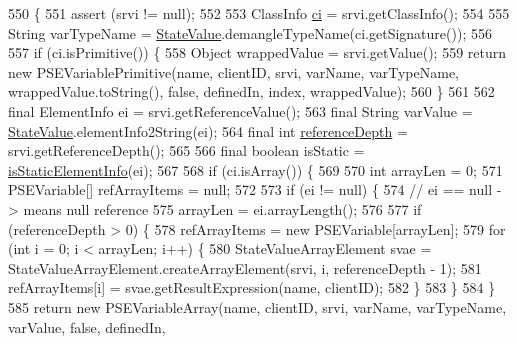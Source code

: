 \begin{DoxyCode}
550                                    \{
551     assert (srvi != null);
552 
553     ClassInfo \hyperlink{classgov_1_1nasa_1_1jpf_1_1inspector_1_1server_1_1programstate_1_1_state_value_a0eb4aa1e630ed6372dcfb8c41ae7edc5}{ci} = srvi.getClassInfo();
554 
555     String varTypeName = \hyperlink{classgov_1_1nasa_1_1jpf_1_1inspector_1_1server_1_1programstate_1_1_state_value_aef9d3691f1dd70f6458c47ce8bc6943c}{StateValue}.demangleTypeName(ci.getSignature());
556 
557     \textcolor{keywordflow}{if} (ci.isPrimitive()) \{
558       Object wrappedValue = srvi.getValue();
559       \textcolor{keywordflow}{return} \textcolor{keyword}{new} PSEVariablePrimitive(name, clientID, srvi, varName, varTypeName, wrappedValue.toString(), \textcolor{keyword}{
      false}, definedIn, index, wrappedValue);
560     \}
561 
562     \textcolor{keyword}{final} ElementInfo ei = srvi.getReferenceValue();
563     \textcolor{keyword}{final} String varValue = \hyperlink{classgov_1_1nasa_1_1jpf_1_1inspector_1_1server_1_1programstate_1_1_state_value_aef9d3691f1dd70f6458c47ce8bc6943c}{StateValue}.elementInfo2String(ei);
564     \textcolor{keyword}{final} \textcolor{keywordtype}{int} \hyperlink{classgov_1_1nasa_1_1jpf_1_1inspector_1_1server_1_1programstate_1_1_state_node_a55683618625dae46e8aa68d95811d6bb}{referenceDepth} = srvi.getReferenceDepth();
565 
566     \textcolor{keyword}{final} \textcolor{keywordtype}{boolean} isStatic = \hyperlink{classgov_1_1nasa_1_1jpf_1_1inspector_1_1server_1_1programstate_1_1_state_value_a25dfd1e417420303104033dd3342c659}{isStaticElementInfo}(ei);
567 
568     \textcolor{keywordflow}{if} (ci.isArray()) \{
569 
570       \textcolor{keywordtype}{int} arrayLen = 0;
571       PSEVariable[] refArrayItems = null;
572 
573       \textcolor{keywordflow}{if} (ei != null) \{
574         \textcolor{comment}{// ei == null -> means null reference}
575         arrayLen = ei.arrayLength();
576 
577         \textcolor{keywordflow}{if} (referenceDepth > 0) \{
578           refArrayItems = \textcolor{keyword}{new} PSEVariable[arrayLen];
579           \textcolor{keywordflow}{for} (\textcolor{keywordtype}{int} i = 0; i < arrayLen; i++) \{
580             StateValueArrayElement svae = StateValueArrayElement.createArrayElement(srvi, i, referenceDepth
       - 1);
581             refArrayItems[i] = svae.getResultExpression(name, clientID);
582           \}
583         \}
584       \}
585       \textcolor{keywordflow}{return} \textcolor{keyword}{new} PSEVariableArray(name, clientID, srvi, varName, varTypeName, varValue, \textcolor{keyword}{false}, definedIn, 

\end{DoxyCode}
